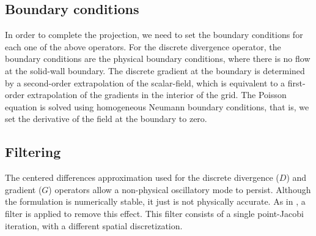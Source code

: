\documentclass{article}
\begin{document}
\subsection{Boundary conditions}

In order to complete the projection, we need to set the boundary conditions for each one of the above operators. For the discrete divergence operator, the boundary conditions are the physical boundary conditions, where there is no flow at the solid-wall boundary. The discrete gradient at the boundary is determined by a second-order extrapolation of the scalar-field, which is equivalent to a first-order extrapolation of the gradients in the interior of the grid. The Poisson equation is solved using homogeneous Neumann boundary conditions, that is, we set the derivative of the field at the boundary to zero.


\subsection{Filtering}

The centered differences approximation used for the discrete divergence ($D$) and gradient ($G$) operators allow a non-physical oscillatory mode to persist. Although the formulation is numerically stable, it just is not physically accurate. As in \cite{Lai1993a}, a filter is applied to remove this effect. This filter consists of a single point-Jacobi iteration, with a different spatial discretization.
\end{document}
